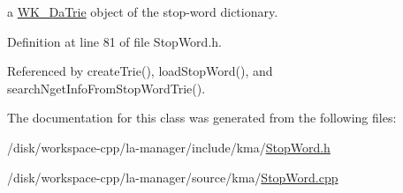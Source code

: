 a \hyperlink{classkmaOrange_1_1WK__DaTrie}{WK\_\-DaTrie} object of the stop-word dictionary. 



Definition at line 81 of file StopWord.h.

Referenced by createTrie(), loadStopWord(), and searchNgetInfoFromStopWordTrie().

The documentation for this class was generated from the following files:\begin{CompactItemize}
\item 
/disk/workspace-cpp/la-manager/include/kma/\hyperlink{StopWord_8h}{StopWord.h}\item 
/disk/workspace-cpp/la-manager/source/kma/\hyperlink{StopWord_8cpp}{StopWord.cpp}\end{CompactItemize}
